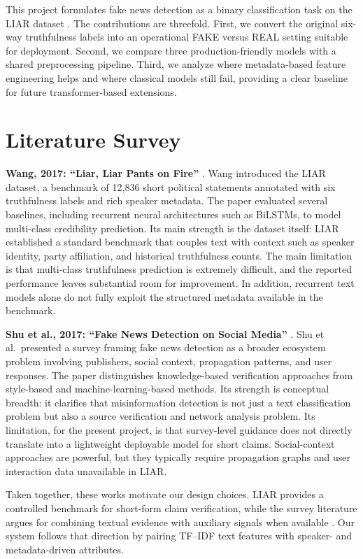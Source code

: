\documentclass[10pt,twocolumn,letterpaper]{article}
\begin{document}
This project formulates fake news detection as a binary classification task on the LIAR dataset \cite{wang2017liar}. The contributions are threefold. First, we convert the original six-way truthfulness labels into an operational FAKE versus REAL setting suitable for deployment. Second, we compare three production-friendly models with a shared preprocessing pipeline. Third, we analyze where metadata-based feature engineering helps and where classical models still fail, providing a clear baseline for future transformer-based extensions.

\section{Literature Survey}
\textbf{Wang, 2017: ``Liar, Liar Pants on Fire''} \cite{wang2017liar}. Wang introduced the LIAR dataset, a benchmark of 12{,}836 short political statements annotated with six truthfulness labels and rich speaker metadata. The paper evaluated several baselines, including recurrent neural architectures such as BiLSTMs, to model multi-class credibility prediction. Its main strength is the dataset itself: LIAR established a standard benchmark that couples text with context such as speaker identity, party affiliation, and historical truthfulness counts. The main limitation is that multi-class truthfulness prediction is extremely difficult, and the reported performance leaves substantial room for improvement. In addition, recurrent text models alone do not fully exploit the structured metadata available in the benchmark.

\textbf{Shu et al., 2017: ``Fake News Detection on Social Media''} \cite{shu2017social}. Shu et al.\ presented a survey framing fake news detection as a broader ecosystem problem involving publishers, social context, propagation patterns, and user responses. The paper distinguishes knowledge-based verification approaches from style-based and machine-learning-based methods. Its strength is conceptual breadth: it clarifies that misinformation detection is not just a text classification problem but also a source verification and network analysis problem. Its limitation, for the present project, is that survey-level guidance does not directly translate into a lightweight deployable model for short claims. Social-context approaches are powerful, but they typically require propagation graphs and user interaction data unavailable in LIAR.

Taken together, these works motivate our design choices. LIAR provides a controlled benchmark for short-form claim verification, while the survey literature argues for combining textual evidence with auxiliary signals when available \cite{wang2017liar,shu2017social,zhou2020survey}. Our system follows that direction by pairing TF--IDF text features with speaker- and metadata-driven attributes.
\end{document}
